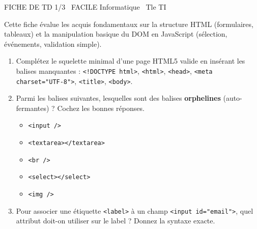 \documentclass[11pt]{article}
\begin{document}
\begin{tcolorbox}[enhanced,colback=popink,colframe=popink,arc=10pt,boxrule=0pt,left=12pt,right=12pt,top=9pt,bottom=9pt]
{\color{white}\popxbold\small FICHE DE TD 1/3 \textbullet\ FACILE \hfill Informatique \textbullet\ Tle TI\par}
\end{tcolorbox}
\vspace{4pt}
Cette fiche évalue les acquis fondamentaux sur la structure HTML (formulaires, tableaux) et la manipulation basique du DOM en JavaScript (sélection, événements, validation simple).

\begin{exercice}
\begin{enumerate}
    \item Complétez le squelette minimal d'une page HTML5 valide en insérant les balises manquantes : \texttt{<!DOCTYPE html>}, \texttt{<html>}, \texttt{<head>}, \texttt{<meta charset="UTF-8">}, \texttt{<title>}, \texttt{<body>}.
    \item Parmi les balises suivantes, lesquelles sont des balises \textbf{orphelines} (auto-fermantes) ? Cochez les bonnes réponses.
    \begin{itemize}
        \item \texttt{<input />}
        \item \texttt{<textarea></textarea>}
        \item \texttt{<br />}
        \item \texttt{<select></select>}
        \item \texttt{<img />}
    \end{itemize}
    \item Pour associer une étiquette \texttt{<label>} à un champ \texttt{<input id="email">}, quel attribut doit-on utiliser sur le label ? Donnez la syntaxe exacte.
\end{enumerate}
\end{exercice}
\end{document}
